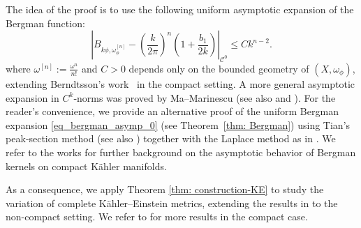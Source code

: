 \documentclass[a4paper, 11pt]{amsart}
\theoremstyle{plain}
\newtheorem{theorem}{Theorem}[section]
\numberwithin{equation}{section} %
\numberwithin{figure}{section} %
\theoremstyle{plain}
\theoremstyle{plain}
\theoremstyle{plain}
\theoremstyle{plain}
\theoremstyle{remark}
\theoremstyle{definition}
\theoremstyle{definition}
\newcommand{\K}{\mathcal{K}}
\begin{document}
\medskip
The idea of the proof is to use the following uniform asymptotic expansion of the Bergman function:
\begin{equation}
\label{eq_bergman_asymp_0}\left|B_{k\phi, \omega_\phi^{[n]}} - \left(\frac{k}{2\pi} \right)^n  \left( 1+ \frac{b_1}{2k}\right)\right|_{\mathcal{C}^0} \leq Ck^{n-2}.
\end{equation}
where $\omega^{[n]}:= \frac{\omega^n}{n!}$  and $C>0$ depends only on the bounded geometry of $(X,\omega_\phi)$, extending Berndtsson's work~\cite{berndtsson09-remarks-tsuji'} in the compact setting. A more general asymptotic expansion in $C^k$‑norms was proved by Ma–Marinescu \cite[Problem~6.1]{MaMarinescu-book} (see also \cite[Theorem~6]{Ma_Marinescu_2015} and \cite{Keller-notes-Bergman}). For the reader's convenience, we provide an alternative proof of the uniform Bergman expansion \eqref{eq_bergman_asymp_0} (see Theorem~\ref{thm: Bergman}) using Tian's peak‑section method \cite{Tian90-metrics-algebraic} (see also \cite{Ruan_1998,Lu00-expansion}) together with the Laplace method as in \cite{donaldson-2009-notes,charles15-bergmankernel}. We refer to the works \cite{deMonvel_Sjostrand_75,Tian90-metrics-algebraic,Catlin_1997,Zelditch_1998,Lu00-expansion,Charles_2003,Dai_Liu_Ma_06,MaMarinescu-book,Berman_Berndtsson_Sjostrand_2008,Ma_Marinescu_2015} for further background on the asymptotic behavior of Bergman kernels on compact K\"ahler manifolds.


\medskip
As a consequence, we apply Theorem \ref{thm: construction-KE} to study the variation of complete K\"ahler--Einstein metrics, extending the results in \cite{Tsuji10-construction-KE, Schumacher12-positivity-bundles, Berman_2013} to the non-compact setting. We refer to \cite{paun17-relative-nef, Guenancia_2020, Cao_Guenancia_Paun_2021} for more results in the compact case.
\end{document}
